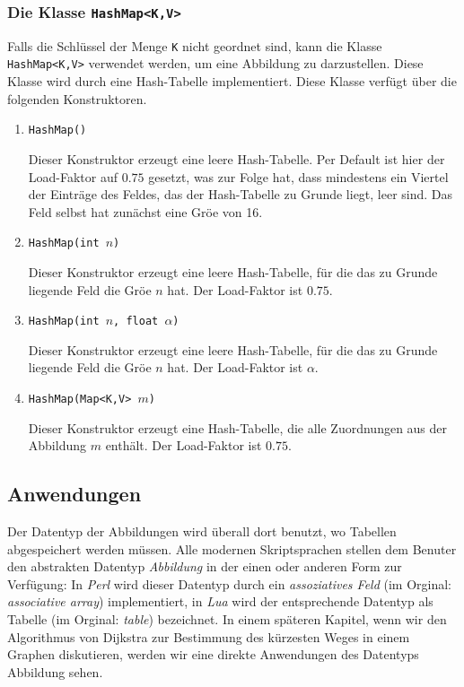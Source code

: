 \subsubsection{Die Klasse \texttt{HashMap<K,V>}} 
Falls die Schl\"ussel der Menge \texttt{K} nicht geordnet sind, kann die Klasse
\texttt{HashMap<K,V>} verwendet werden, um eine Abbildung zu darzustellen.  Diese Klasse
wird durch eine Hash-Tabelle implementiert. Diese Klasse verf\"ugt \"uber die folgenden Konstruktoren.
\begin{enumerate}
\item \texttt{HashMap()}
  
      Dieser Konstruktor erzeugt eine leere Hash-Tabelle.  Per Default ist
      hier der Load-Faktor auf $0.75$ gesetzt, was zur Folge hat, dass mindestens
      ein Viertel der Eintr\"age des Feldes, das der Hash-Tabelle zu Grunde liegt,
      leer sind.  Das Feld selbst hat zun\"achst eine Gr\"o\3e von 16.
\item \texttt{HashMap(int $n$)}
  
      Dieser Konstruktor erzeugt eine leere Hash-Tabelle, f\"ur die das zu Grunde
      liegende Feld die Gr\"o\3e $n$ hat.  Der Load-Faktor ist $0.75$.
\item \texttt{HashMap(int $n$, float $\alpha$)}

      Dieser Konstruktor erzeugt eine leere Hash-Tabelle, f\"ur die das zu Grunde
      liegende Feld die Gr\"o\3e $n$ hat.  Der Load-Faktor ist $\alpha$.
\item \texttt{HashMap(Map<K,V> $m$)}

      Dieser Konstruktor erzeugt eine Hash-Tabelle, die alle Zuordnungen aus der
      Abbildung $m$ enth\"alt.  Der Load-Faktor ist $0.75$.
\end{enumerate}

\subsection{Anwendungen}
Der Datentyp der Abbildungen wird \"uberall dort benutzt, wo Tabellen abgespeichert werden
m\"ussen.  Alle modernen Skriptsprachen stellen dem Benuter den abstrakten Datentyp
\emph{Abbildung} in der einen oder anderen Form zur Verf\"ugung:  In \textsl{Perl}
\cite{Wall92} wird
dieser Datentyp durch ein \emph{assoziatives Feld} (im Orginal: \emph{associative array})
implementiert, in \textsl{Lua} \cite{ierusalimschy:2006,Ieru96a} 
wird der entsprechende Datentyp als Tabelle (im Orginal:
\emph{table}) bezeichnet.
In einem sp\"ateren Kapitel, wenn wir den Algorithmus von Dijkstra zur Bestimmung
des k\"urzesten Weges in einem 
Graphen diskutieren, werden wir eine direkte Anwendungen des Datentyps Abbildung sehen.


